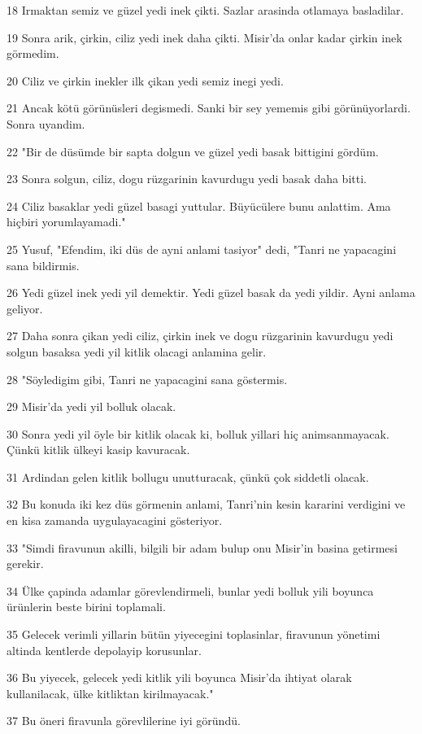 \par 18 Irmaktan semiz ve güzel yedi inek çikti. Sazlar arasinda otlamaya basladilar.
\par 19 Sonra arik, çirkin, ciliz yedi inek daha çikti. Misir'da onlar kadar çirkin inek görmedim.
\par 20 Ciliz ve çirkin inekler ilk çikan yedi semiz inegi yedi.
\par 21 Ancak kötü görünüsleri degismedi. Sanki bir sey yememis gibi görünüyorlardi. Sonra uyandim.
\par 22 "Bir de düsümde bir sapta dolgun ve güzel yedi basak bittigini gördüm.
\par 23 Sonra solgun, ciliz, dogu rüzgarinin kavurdugu yedi basak daha bitti.
\par 24 Ciliz basaklar yedi güzel basagi yuttular. Büyücülere bunu anlattim. Ama hiçbiri yorumlayamadi."
\par 25 Yusuf, "Efendim, iki düs de ayni anlami tasiyor" dedi, "Tanri ne yapacagini sana bildirmis.
\par 26 Yedi güzel inek yedi yil demektir. Yedi güzel basak da yedi yildir. Ayni anlama geliyor.
\par 27 Daha sonra çikan yedi ciliz, çirkin inek ve dogu rüzgarinin kavurdugu yedi solgun basaksa yedi yil kitlik olacagi anlamina gelir.
\par 28 "Söyledigim gibi, Tanri ne yapacagini sana göstermis.
\par 29 Misir'da yedi yil bolluk olacak.
\par 30 Sonra yedi yil öyle bir kitlik olacak ki, bolluk yillari hiç animsanmayacak. Çünkü kitlik ülkeyi kasip kavuracak.
\par 31 Ardindan gelen kitlik bollugu unutturacak, çünkü çok siddetli olacak.
\par 32 Bu konuda iki kez düs görmenin anlami, Tanri'nin kesin kararini verdigini ve en kisa zamanda uygulayacagini gösteriyor.
\par 33 "Simdi firavunun akilli, bilgili bir adam bulup onu Misir'in basina getirmesi gerekir.
\par 34 Ülke çapinda adamlar görevlendirmeli, bunlar yedi bolluk yili boyunca ürünlerin beste birini toplamali.
\par 35 Gelecek verimli yillarin bütün yiyecegini toplasinlar, firavunun yönetimi altinda kentlerde depolayip korusunlar.
\par 36 Bu yiyecek, gelecek yedi kitlik yili boyunca Misir'da ihtiyat olarak kullanilacak, ülke kitliktan kirilmayacak."
\par 37 Bu öneri firavunla görevlilerine iyi göründü.

